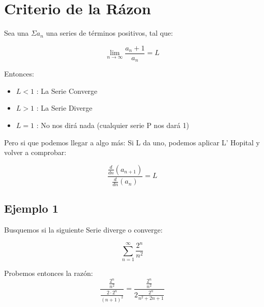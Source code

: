 \documentclass[12pt]{report}							    %
\begin{document}
    \section{Criterio de la Rázon}

        Sea una $\Sigma a_n$ una series de términos positivos, tal que:

        \begin{equation}
            \lim_{n \to \infty} \frac{a_n+1}{a_n} = L
        \end{equation}

        Entonces:
        \begin{itemize}
            \item $L < 1$ : La Serie Converge
            \item $L > 1$ : La Serie Diverge
            \item $L = 1$ : No nos dirá nada (cualquier serie P nos dará 1)
        \end{itemize}

        Pero si que podemos llegar a algo más:
        Si L da uno, podemos aplicar L' Hopital y volver a comprobar:

        \begin{equation}
        \frac{\frac{d}{dn} (a_{n+1})}{\frac{d}{dn} (a_n)} = L
        \end{equation}



        \subsection{Ejemplo 1}
        Busquemos si la siguiente Serie diverge o converge:

        \begin{equation*}
            \sum_{n=1}^{\infty} \frac{2^n}{n^2}
        \end{equation*}

        Probemos entonces la razón:
        \begin{equation*}
            \frac{ \frac{2^n}{n^2} }{ \frac{2 \cdot 2^n}{(n+1)^2 } } = \frac{ \frac{2^n}{n^2} }{ 2 \frac{2^n}{n^2 + 2n + 1} }
        \end{equation*}



    \clearpage
\end{document}
